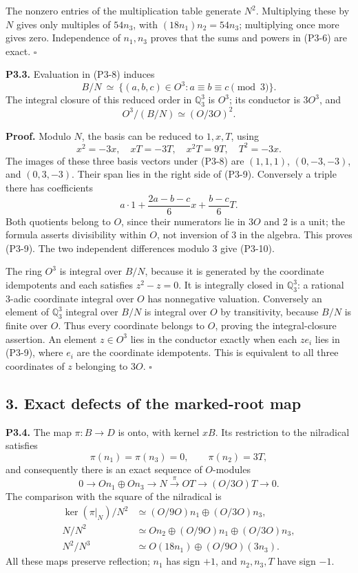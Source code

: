 \documentclass[
]{article}
\begin{document}
The nonzero entries of the multiplication table generate \(N^2\).
Multiplying these by \(N\) gives only multiples of \(54n_3\), with
\((18n_1)n_2=54n_3\); multiplying once more gives zero. Independence of
\(n_1,n_3\) proves that the sums and powers in (P3-6) are exact.
\(\square\)

\textbf{P3.3.} Evaluation in (P3-8) induces \[
B/N\ \simeq\ \{(a,b,c)\in O^3:a\equiv b\equiv c\pmod3\}.
\tag{P3-9}
\] The integral closure of this reduced order in \(\mathbb Q_3^3\) is
\(O^3\); its conductor is \(3O^3\), and \[
O^3/(B/N)\simeq (O/3O)^2.
\tag{P3-10}
\]

\textbf{Proof.} Modulo \(N\), the basis can be reduced to \(1,x,T\),
using \[
x^2=-3x,\quad xT=-3T,\quad x^2T=9T,\quad T^2=-3x.
\] The images of these three basis vectors under (P3-8) are \((1,1,1)\),
\((0,-3,-3)\), and \((0,3,-3)\). Their span lies in the right side of
(P3-9). Conversely a triple there has coefficients \[
a\cdot1+\frac{2a-b-c}{6}x+\frac{b-c}{6}T.
\] Both quotients belong to \(O\), since their numerators lie in \(3O\)
and 2 is a unit; the formula asserts divisibility within \(O\), not
inversion of 3 in the algebra. This proves (P3-9). The two independent
differences modulo 3 give (P3-10).

The ring \(O^3\) is integral over \(B/N\), because it is generated by
the coordinate idempotents and each satisfies \(z^2-z=0\). It is
integrally closed in \(\mathbb Q_3^3\): a rational 3-adic coordinate
integral over \(O\) has nonnegative valuation. Conversely an element of
\(\mathbb Q_3^3\) integral over \(B/N\) is integral over \(O\) by
transitivity, because \(B/N\) is finite over \(O\). Thus every
coordinate belongs to \(O\), proving the integral-closure assertion. An
element \(z\in O^3\) lies in the conductor exactly when each \(ze_i\)
lies in (P3-9), where \(e_i\) are the coordinate idempotents. This is
equivalent to all three coordinates of \(z\) belonging to \(3O\).
\(\square\)

\subsection{3. Exact defects of the marked-root
map}\label{exact-defects-of-the-marked-root-map}

\textbf{P3.4.} The map \(\pi:B\to D\) is onto, with kernel \(xB\). Its
restriction to the nilradical satisfies \[
\pi(n_1)=\pi(n_3)=0,\qquad\pi(n_2)=3T,
\tag{P3-11}
\] and consequently there is an exact sequence of \(O\)-modules \[
0\longrightarrow On_1\oplus On_3\longrightarrow N
\xrightarrow{\ \pi\ }OT\longrightarrow (O/3O)T\longrightarrow0.
\tag{P3-12}
\] The comparison with the square of the nilradical is \[
\begin{aligned}
\ker(\pi|_N)/N^2&\simeq (O/9O)n_1\oplus(O/3O)n_3,\\
N/N^2&\simeq On_2\oplus(O/9O)n_1\oplus(O/3O)n_3,\\
N^2/N^3&\simeq O(18n_1)\oplus(O/9O)(3n_3).
\end{aligned}
\tag{P3-13}
\] All these maps preserve reflection; \(n_1\) has sign \(+1\), and
\(n_2,n_3,T\) have sign \(-1\).
\end{document}
